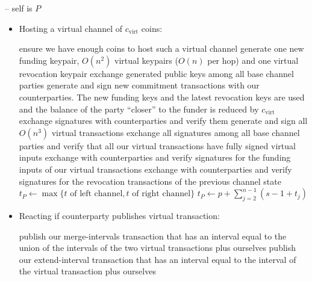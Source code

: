 \begin{center}
\begin{processbox}{\pchan -- self is $P$}
\begin{itemize}
      \item Hosting a virtual channel of $c_{\mathrm{virt}}$ coins:
      \begin{algorithmic}[0]
        \State ensure we have enough coins to host such a virtual channel
        \State generate one new funding keypair, $O(n^2)$ virtual keypairs
        ($O(n)$ per hop) and one virtual revocation keypair 
        \State exchange generated public keys among all base channel parties
        \State generate and sign new commitment transactions with our
        counterparties. The new funding keys and the latest revocation keys are
        used and the balance of the party ``closer'' to the funder is reduced by
        $c_{\mathrm{virt}}$ 
        \State exchange signatures with counterparties and verify them
        \State generate and sign all $O(n^3)$ virtual transactions 
        \State exchange all signatures among all base channel parties and verify
        that all our virtual transactions have fully signed virtual inputs
        \State exchange with counterparties and verify signatures for the
        funding inputs of our virtual transactions 
        \State exchange with counterparties and verify signatures for the
        revocation transactions of the previous channel state
          \State $t_P \gets \max\{t \text{ of left channel}, t \text{ of right
          channel}\}$
        \Else \: 
          \State $t_P \gets p + \sum\limits_{j = 2}^{n-1}(s - 1 + t_j)$
        \EndIf
      \end{algorithmic}

      \item Reacting if counterparty publishes virtual transaction:
      \begin{algorithmic}[0]
          \State publish our merge-intervals transaction that has an interval
          equal to the union of the intervals of the two virtual transactions
          plus ourselves
        \Else \: 
          \State publish our extend-interval transaction that has an interval
          equal to the interval of the virtual transaction plus ourselves
        \EndIf
      \end{algorithmic}


\end{itemize}
\end{processbox}
\end{center}
